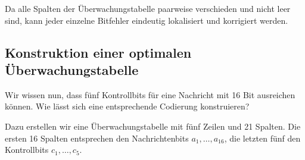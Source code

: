 \begin{mychallenge}
\begin{myanswer}
\begin{center}
        \end{center}

        Da alle Spalten der Überwachungstabelle paarweise verschieden
        und nicht leer sind, kann jeder einzelne Bitfehler eindeutig
        lokalisiert und korrigiert werden.

    \end{myanswer}
\end{mychallenge}





\subsection*{Konstruktion einer optimalen Überwachungstabelle}

Wir wissen nun, dass fünf Kontrollbits für eine Nachricht
mit 16 Bit ausreichen können. Wie lässt sich eine
entsprechende Codierung konstruieren?

Dazu erstellen wir eine Überwachungstabelle mit fünf Zeilen
und 21 Spalten. Die ersten 16 Spalten entsprechen den
Nachrichtenbits \(a_1,\ldots,a_{16}\), die letzten fünf den
Kontrollbits \(c_1,\ldots,c_5\).


